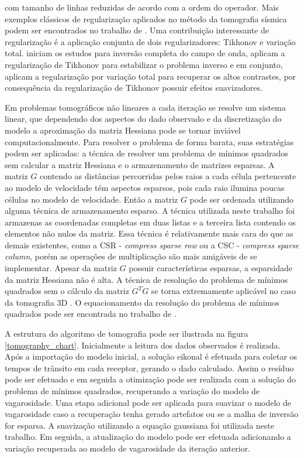 \noindent com tamanho de linhas reduzidas de acordo com a ordem do operador. Mais exemplos clássicos de regularização aplicados no método da tomografia sísmica podem ser encontrados no trabalho de . Uma contribuição interessante de regularização é a aplicação conjunta de dois regularizadores: Tikhonov e variação total.  iniciam os estudos para inversão completa do campo de onda,  aplicam a regularização de Tikhonov para estabilizar o problema inverso e em conjunto, aplicam a regularização por variação total para recuperar os altos contrastes, por consequência da regularização de Tikhonov possuir efeitos suavizadores.   

Em problemas tomográficos não lineares a cada iteração se resolve um sistema linear, que dependendo dos aspectos do dado observado e da discretização do modelo a aproximação da matriz Hessiana pode se tornar inviável computacionalmente. Para resolver o problema de forma barata, suas estratégias podem ser aplicadas: a técnica de resolver um problema de mínimos quadrados sem calcular a matriz Hessiana e o armazenamento de matrizes esparsas. A matriz $G$ contendo as distâncias percorridas pelos raios a cada célula pertencente ao modelo de velocidade têm aspectos esparsos, pois cada raio ilumina poucas células no modelo de velocidade. Então a matriz $G$ pode ser ordenada utilizando alguma técnica de armazenamento esparso. A técnica utilizada neste trabalho foi armazenas as coordenadas completas em duas listas e a terceira lista contendo os elementos não nulos da matriz. Essa técnica é relativamente mais cara do que as demais existentes, como a CSR - \textit{compress sparse row} ou a CSC - \textit{compress sparse column}, porém as operações de multiplicação são mais amigáveis de se implementar. Apesar da matriz $G$ possuir características esparsas, a esparsidade da matriz Hessiana não é alta. A técnica de resolução do problema de mínimos quadrados sem o cálculo da matriz $G^TG$ se torna extremamente aplicável no caso da tomografia 3D \cite{hestenes1952methods, saad2003iterative}. O equacionamento da resolução do problema de mínimos quadrados pode ser encontrada no trabalho de . 

A estrutura do algoritmo de tomografia pode ser ilustrada na figura \ref{tomography_chart}. Inicialmente a leitura dos dados observados é realizada. Após a importação do modelo inicial, a solução eikonal é efetuada para coletar os tempos de trânsito em cada receptor, gerando o dado calculado. Assim o resíduo pode ser efetuado e em seguida a otimização pode ser realizada com a solução do problema de mínimos quadrados, recuperando a variação do modelo de vagarosidade. Uma etapa adicional pode ser aplicada para suavizar o modelo de vagarosidade caso a recuperação tenha gerado artefatos ou se a malha de inversão for esparsa. A suavização utilizando a equação gaussiana foi utilizada neste trabalho. Em seguida, a atualização do modelo pode ser efetuada adicionando a variação recuperada ao modelo de vagarosidade da iteração anterior. 

